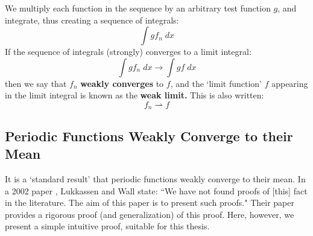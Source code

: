 \documentclass[12pt, a4paper, twoside, openright]{book}
\begin{document}
We multiply each function in the sequence by an arbitrary test function $g$, and integrate, thus creating a sequence of integrals:
\begin{equation}
\int g f_n \;dx
\end{equation}
If the sequence of integrals (strongly) converges to a limit integral:
\begin{equation}
\int g f_n \;dx \to \int g f \;dx
\end{equation}
then we say that $f_n$ \textbf{weakly converges} to $f$, and the `limit function' $f$ appearing in the limit integral is known as the \textbf{weak limit.}  This is also written:
\begin{equation}
f_n \rightharpoonup f
\end{equation}


\subsection{Periodic Functions Weakly Converge to their Mean}

It is a `standard result' that periodic functions weakly converge to their mean.  In a 2002 paper \cite{Lukkassen2002}, Lukkassen and Wall state: ``We have not found proofs of [this] fact in the literature.  The aim of this paper is to present such proofs."  Their paper provides a rigorous proof (and generalization) of this proof.  Here, however, we present a simple intuitive proof, suitable for this thesis.

\vspace{1em}
\end{document}
